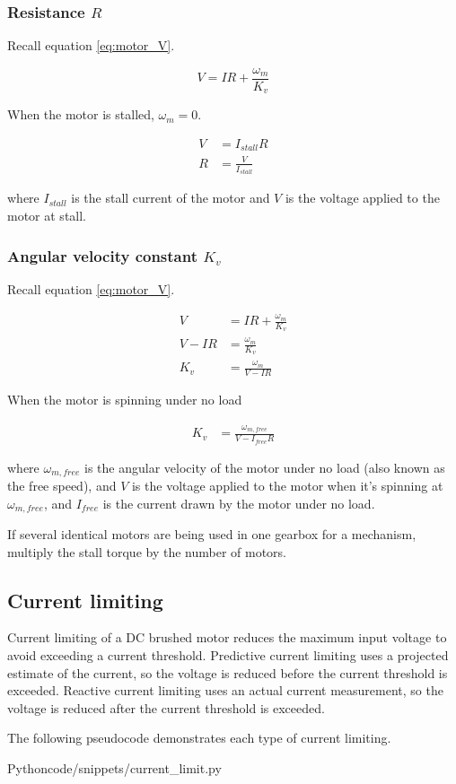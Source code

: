 \subsubsection{Resistance $R$}

Recall equation \eqref{eq:motor_V}.

\begin{equation*}
  V = IR + \frac{\omega_m}{K_v}
\end{equation*}

When the motor is stalled, $\omega_m = 0$.

\begin{align}
  V &= I_{stall} R \nonumber \\
  R &= \frac{V}{I_{stall}}
\end{align}

where $I_{stall}$ is the stall current of the motor and $V$ is the voltage
applied to the motor at stall.

\subsubsection{Angular velocity constant $K_v$}

Recall equation \eqref{eq:motor_V}.

\begin{align*}
  V &= IR + \frac{\omega_m}{K_v} \\
  V - IR &= \frac{\omega_m}{K_v} \\
  K_v &= \frac{\omega_m}{V - IR}
\end{align*}

When the motor is spinning under no load

\begin{align}
  K_v &= \frac{\omega_{m,free}}{V - I_{free}R}
\end{align}

where $\omega_{m,free}$ is the angular velocity of the motor under no load (also
known as the free speed), and $V$ is the voltage applied to the motor when it's
spinning at $\omega_{m,free}$, and $I_{free}$ is the current drawn by the motor
under no load.

If several identical motors are being used in one gearbox for a mechanism,
multiply the stall torque by the number of motors.

\subsection{Current limiting}

Current limiting of a DC brushed motor reduces the maximum input voltage to
avoid exceeding a current threshold. Predictive current limiting uses a
projected estimate of the current, so the voltage is reduced before the current
threshold is exceeded. Reactive current limiting uses an actual current
measurement, so the voltage is reduced after the current threshold is exceeded.

The following pseudocode demonstrates each type of current limiting.

\begin{code}{Python}{code/snippets/current_limit.py}
  \caption{Limits current of DC motor to $I_{max}$}
  \label{lst:dc_motor_current_limit}
\end{code}
